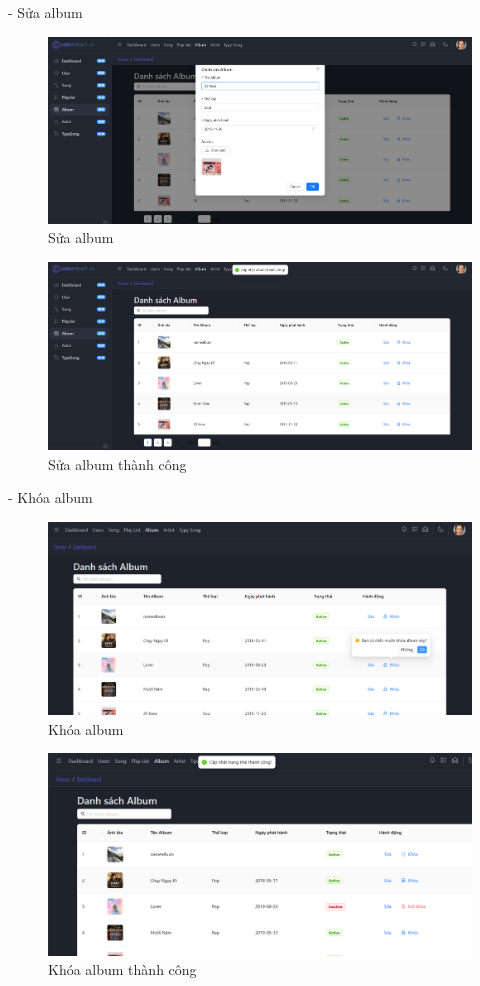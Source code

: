 - Sửa album
\begin{figure}[H]
    \centering
    \includegraphics[width=1\textwidth]{imgs/chap5/ql_album_3.png}
    \caption{Sửa album}
\end{figure}
\begin{figure}[H]
    \centering
    \includegraphics[width=1\textwidth]{imgs/chap5/ql_album_4.png}
    \caption{Sửa album thành công}
\end{figure}

- Khóa album
\begin{figure}[H]
    \centering
    \includegraphics[width=1\textwidth]{imgs/chap5/ql_album_5.png}
    \caption{Khóa album}
\end{figure}
\begin{figure}[H]
    \centering
    \includegraphics[width=1\textwidth]{imgs/chap5/ql_album_6.png}
    \caption{Khóa album thành công}
\end{figure}

